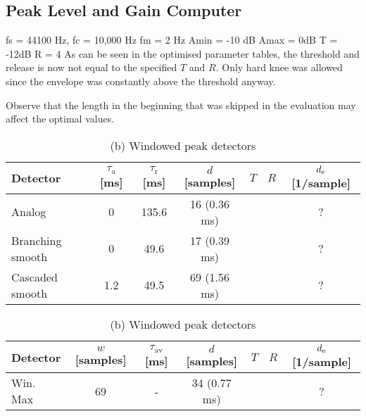 \documentclass[../main2.tex]{subfiles}
\begin{document}
\subsection{Peak Level and Gain Computer}

fs = 44100 Hz, fc = 10,000 Hz fm = 2 Hz
Amin = -10 dB Amax = 0dB
T = -12dB
R = 4
As can be seen in the optimised parameter tables, the threshold and release is now not equal to the specified $T$ and $R$. Only hard knee was allowed since the envelope was constantly above the threshold anyway.

Observe that the length in the beginning that was skipped in the evaluation may affect the optimal values.

\begin{table}[h]
\begin{center}
\caption{Optimised parameters for the various peak detectors, $f_c=\text{10,000}$ Hz, $f_m=2$ Hz}
\label{tab:peak_det_gain_computer_opt_params}
\caption*{(a) Attack and release peak detectors}
\begin{tabular}{| l | c c c c c | c |}
	\hline
	Detector 	& $\tau_\text{a}$ [ms] & $\tau_\text{r}$ [ms] & $d$ [samples] & $T$ & $R$ & $d_\text{e}$ [1/sample]\\
	\hline
	
	Analog 			& 0 		& 135.6 	& 16	(0.36 ms)	& & &?	\\ 
	Branching smooth 	& 0	 	& 49.6 	& 17	(0.39 ms)	& & &?	\\ 
	Cascaded smooth	& 1.2	& 49.5 	& 69	(1.56 ms)	& & &?	\\
	\hline
\end{tabular}
\end{center}

\begin{center}
\caption*{(b) Windowed peak detectors}
 \begin{tabular}{| l | c c c c c | c |}
	\hline
	Detector & $w$ [samples] & $\tau_\text{av}$ [ms] & $d$ [samples] & $T$& $R$ &$d_\text{e}$ [1/sample] \\
	\hline
	Win. Max		& 69		& -		& 34	(0.77 ms)	& & &?	\\
	\hline
\end{tabular}
\end{center}

\end{table}
\end{document}
